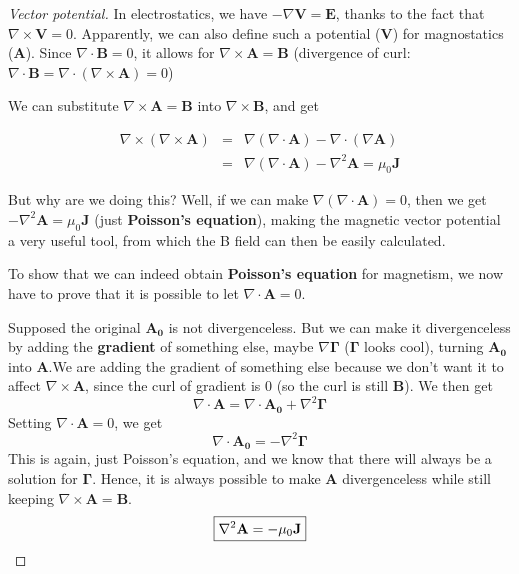 \documentclass[12pt,a4paper]{extreport}
\numberwithin{equation}{chapter}
\begin{document}
    \begin{proof}[Vector potential]
        In electrostatics, we have $-\nabla \mathbf{V}=\mathbf{E}$, thanks to the fact that $\nabla \times \mathbf{V}=0$. 
        Apparently, we can also define such a potential ($\mathbf{V}$) for magnostatics ($\mathbf{A}$).
        Since $\nabla \cdot \mathbf{B}=0$, it allows for $\nabla \times \mathbf{A}=\mathbf{B}$ (divergence of curl: $\nabla \cdot \mathbf{B}=\nabla \cdot (\nabla \times \mathbf{A})=0$)

        We can substitute $\nabla \times \mathbf{A}=\mathbf{B}$ into $\nabla \times \mathbf{B}$, and get 

        \begin{eqnarray}
            \nabla \times (\nabla \times \mathbf{A})&=&\nabla(\nabla \cdot \mathbf{A})-\nabla \cdot (\nabla \mathbf{A})\\
            &=&\nabla(\nabla \cdot \mathbf{A})-\nabla^2 \mathbf{A}=\mu_0 \mathbf{J}
        \end{eqnarray}

        But why are we doing this? Well, if we can make $\nabla(\nabla \cdot \mathbf{A})=0$, then we get $-\nabla^2 \mathbf{A}=\mu_0 \mathbf{J}$ (just \textbf{Poisson's equation}), making the magnetic vector potential a very useful tool, from which the B field can then be easily calculated.
        
        To show that we can indeed obtain \textbf{Poisson's equation} for magnetism, we now have to prove that it is possible to let $\nabla \cdot \mathbf{A}=0$. 

        Supposed the original $\mathbf{A_0}$ is not divergenceless. But we can make it divergenceless by adding the \textbf{gradient} of something else, maybe $\nabla \mathbf{\Gamma}$ ($\mathbf{\Gamma}$ looks cool), turning $\mathbf{A_0}$ into $\mathbf{A}$.We are adding the gradient of something else because we don't want it to affect $\nabla \times \mathbf{A}$, since the curl of gradient is 0 (so the curl is still $\mathbf{B}$). We then get 
        \begin{equation}
            \nabla \cdot \mathbf{A}=\nabla \cdot \mathbf{A_0}+\nabla ^2 \mathbf{\Gamma}
        \end{equation}
        Setting $\nabla \cdot \mathbf{A}=0$, we get
        \begin{equation}
            \nabla \cdot \mathbf{A_0}=-\nabla ^2 \mathbf{\Gamma}
        \end{equation}
        This is again, just Poisson's equation, and we know that there will always be a solution for $\mathbf{\Gamma}$. Hence, it is always possible to make $\mathbf{A}$ divergenceless while still keeping $\nabla \times \mathbf{A}=\mathbf{B}$.
        \begin{equation}
            \boxed{\nabla^2 \mathbf{A}=-\mu_0 \mathbf{J}}\qedhere
        \end{equation}
    \end{proof}
\end{document}
